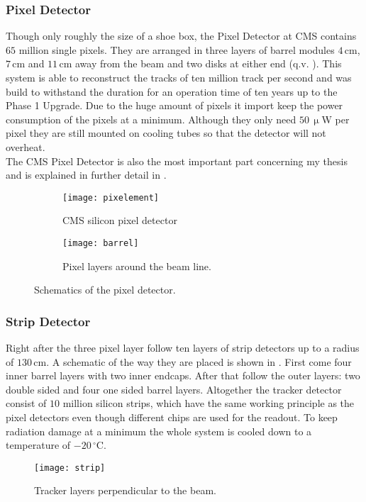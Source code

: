 \subsubsection{Pixel Detector}
Though only roughly the size of a shoe box, the Pixel Detector at \ac{CMS} contains $65$ million single pixels. They are arranged in three layers of barrel modules $4\,$cm, $7\,$cm and $11\,$cm away from the beam and two disks at either end (q.v. ). This system is able to reconstruct the tracks of ten million track per second and was build to withstand the duration for an operation time of ten years up to the Phase 1 Upgrade. Due to the huge amount of pixels it import keep the power consumption of the pixels at a minimum. Although they only need $50\,\upmu$W per pixel they are still mounted on cooling tubes so that the detector will not overheat.\\
The \ac{CMS} Pixel Detector is also the most important part concerning my thesis and is explained in further detail in .
\begin{figure}[ht]
	\centering
	\begin{subfigure}[b]{0.47\textwidth}
        \texttt{[image: pixelement]}
		\caption{\ac{CMS} silicon pixel detector}
		\label{p21}
	\end{subfigure}
	\hfill
	\begin{subfigure}[b]{0.47\textwidth}
		\texttt{[image: barrel]}
		\caption{Pixel layers around the beam line.}
		\label{p22}
	\end{subfigure}
	\caption{Schematics of the pixel detector.}
	\label{ppixdet}
\end{figure}
\subsubsection{Strip Detector}
Right after the three pixel layer follow ten layers of strip detectors up to a radius of $130\,$cm. A schematic of the way they are placed is shown in . First come four inner barrel layers with two inner endcaps. After that follow the outer layers: two double sided and four one sided barrel layers. Altogether the tracker detector consist of $10$ million silicon strips, which have the same working principle as the pixel detectors even though different chips are used for the readout. To keep radiation damage at a minimum the whole system is cooled down to a temperature of $-20\,^{\circ}$C.
\begin{figure}[ht]
	\centering
	\texttt{[image: strip]}
	\caption{Tracker layers perpendicular to the beam.}
	\label{p23}
\end{figure}
